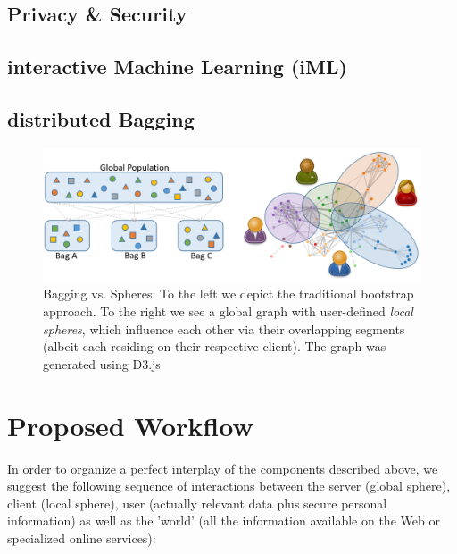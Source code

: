 \documentclass{llncs}
\begin{document}
\cite{shi2012reciprocalrank}

\subsection{Privacy \& Security}
\label{ssect:privacy_security}

\cite{malle2016right}

\subsection{interactive Machine Learning (iML)}
\label{ssect:iML}

\cite{2016iMLExperiment}
\cite{2016HolzingeriML}
\cite{2016KiesebergDITL}

\subsection{distributed Bagging}
\label{ssect:dist_bag}

\cite{breiman1996bagging}

\begin{figure}[H]
	\begin{center}
		\includegraphics[width=1\textwidth]{figures/bagging_vs_local_sphere}
		\caption{Bagging vs. Spheres: To the left we depict the traditional bootstrap approach. To the right we see a global graph with user-defined \textit{local spheres}, which influence each other via their overlapping segments (albeit each residing on their respective client). The graph was generated using D3.js \cite{zhu2013d3js}}
		\label{fig:bagging_vs_sphere}
	\end{center}
\end{figure}


\section{Proposed Workflow}
\label{sect:workflow}

In order to organize a perfect interplay of the components described above, we suggest the following sequence of interactions between the server (global sphere), client (local sphere), user (actually relevant data plus secure personal information) as well as the 'world' (all the information available on the Web or specialized online services):
\end{document}

